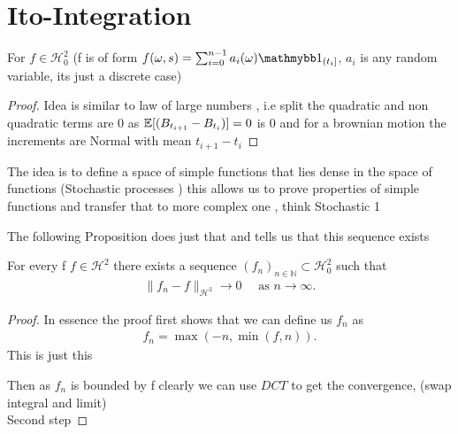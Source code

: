\chapter{Ito-Integration}
\begin{lemma}
  For $f \in  \mathcal{H}_0^2$ (f is of form $f(\omega ,s) = \sum_{i=0}^{n-1} a_i(\omega )\cha_{(t_i]} $, $a_i$ is any random variable, its just 
  a discrete case)   
\end{lemma}
\begin{proof}
  Idea is similar to law of large numbers , i.e split the quadratic and non quadratic terms are 0 as $\mathbb{E}[(B_{t_{i+1}} - B_{t_i})] = 0 $ is 0 and for a brownian motion 
  the increments are Normal with mean $t_{i+1} - t_i$
\end{proof}
\begin{remark}
 The idea is to define a space of simple functions that lies dense in the space of functions (Stochastic processes )  this allows 
 us to prove properties of simple functions and transfer that to more complex one , think Stochastic 1 
\end{remark}
The following Proposition does just that and tells us that this sequence exists
\begin{prop}
  For every f $f \in  \mathcal{H}^2$ there exists a sequence  $(f_n)_{n \in  \mathbb{N}} \subset  \mathcal{H}_0^{2} $ such that 
  \begin{align*}
    \|f_n - f\|_{\mathcal{H}^{2}} \to  0 \quad \text{ as } n\to \infty
  .\end{align*}
\end{prop}
\begin{proof}
 In essence the proof first shows that we can define us $f_n $ as 
 \begin{align*}
  f_n =  \max(-n, \min(f,n))
 .\end{align*}
 This is just this 
\begin{figure}[H]
   \begin{center}
   \end{center}
 \end{figure}
 Then as $f_n$ is bounded by f clearly we can use $DCT$ to get the convergence, (swap integral and limit) \\[1ex]
 Second step 
\end{proof}
